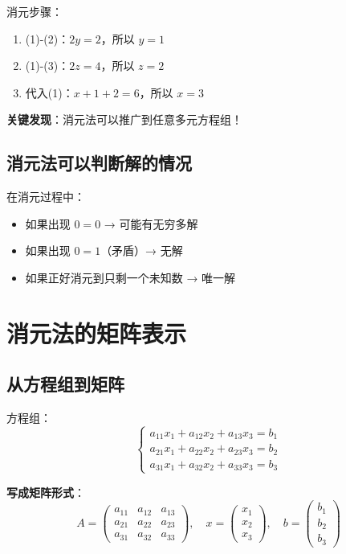 \documentclass[12pt,a4paper]{article}
\begin{document}
消元步骤：
\begin{enumerate}
    \item (1)-(2)：$2y = 2$，所以 $y = 1$
    \item (1)-(3)：$2z = 4$，所以 $z = 2$
    \item 代入(1)：$x + 1 + 2 = 6$，所以 $x = 3$
\end{enumerate}

\textbf{关键发现}：消元法可以推广到任意多元方程组！

\subsection{消元法可以判断解的情况}

在消元过程中：
\begin{itemize}
    \item 如果出现 $0 = 0$ → 可能有无穷多解
    \item 如果出现 $0 = 1$（矛盾）→ 无解
    \item 如果正好消元到只剩一个未知数 → 唯一解
\end{itemize}

\section{消元法的矩阵表示}

\subsection{从方程组到矩阵}

方程组：
\[
\begin{cases}
a_{11}x_1 + a_{12}x_2 + a_{13}x_3 = b_1 \\
a_{21}x_1 + a_{22}x_2 + a_{23}x_3 = b_2 \\
a_{31}x_1 + a_{32}x_2 + a_{33}x_3 = b_3
\end{cases}
\]

\textbf{写成矩阵形式}：
\[
A = \begin{pmatrix}
a_{11} & a_{12} & a_{13} \\
a_{21} & a_{22} & a_{23} \\
a_{31} & a_{32} & a_{33}
\end{pmatrix}, \quad
x = \begin{pmatrix} x_1 \\ x_2 \\ x_3 \end{pmatrix}, \quad
b = \begin{pmatrix} b_1 \\ b_2 \\ b_3 \end{pmatrix}
\]
\end{document}
